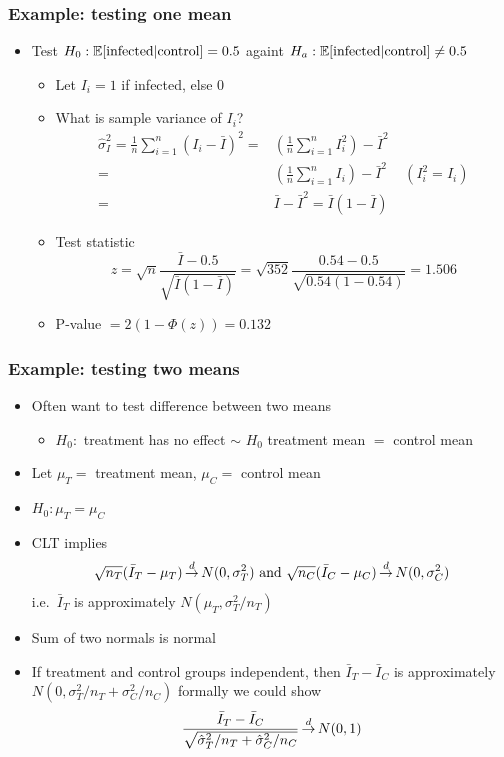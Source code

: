 \begin{frame}[shrink]
  \frametitle{Example: testing one mean}
  \begin{itemize}
  \item Test $H_0: \mathbb{E}[\text{infected}|\text{control}] = 0.5$ againt
    $H_a: \mathbb{E}[\text{infected}|\text{control}] \neq 0.5$
    \begin{itemize}
    \item Let $I_{i} = 1$ if infected, else $0$
    \item What is sample variance of $I_i$?
      \begin{align*}
        \hat{\sigma}_I^2 = \frac{1}{n} \sum_{i=1}^n (I_i - \bar{I})^2 = & \left(\frac{1}{n}
          \sum_{i=1}^n I_i^2\right) - \bar{I}^2 \\
        = &  \left(\frac{1}{n} \sum_{i=1}^n I_i \right) - \bar{I}^2
        \;\text{ }\; (I_i^2 = I_i) \\
        = & \bar{I} - \bar{I}^2 = \bar{I}(1-\bar{I})
      \end{align*}
    \item Test statistic
      \[ z = \sqrt{n} \frac{\bar{I} - 0.5}{\sqrt{\bar{I}(1-\bar{I})}} =
      \sqrt{352} \frac{0.54 - 0.5}{\sqrt{0.54(1-0.54)}} = 1.506 \]
    \item P-value $ = 2(1-\Phi(z)) = 0.132$
    \end{itemize}
  \end{itemize}
\end{frame}

\begin{frame}
  \frametitle{Example: testing two means}
  \begin{itemize}
  \item Often want to test difference between two means
    \begin{itemize}
    \item $H_0:$ treatment has no effect $\sim$ $H_0$ treatment mean $
      = $ control mean
    \end{itemize}
  \item Let $\mu_T = $ treatment mean, $\mu_C = $ control mean
  \item $H_0: \mu_T = \mu_C$
  \item CLT implies 
    \[ \sqrt{n_T} (\bar{I}_T - \mu_T) \indist N(0,
    \sigma_T^2) \text{ and } \sqrt{n_C} (\bar{I}_C - \mu_C) \indist N(0,
    \sigma_C^2) \]
    i.e.\ $\bar{I}_T $ is approximately $N(\mu_T, \sigma_T^2/n_T)$ 
  \item Sum of two normals is normal
  \item If treatment and control groups independent, then
    $\bar{I}_T - \bar{I}_C $ is approximately $N(0, \sigma_T^2/n_T +
    \sigma_C^2/n_C)$ formally we could show
    \begin{align*}
      \frac{\bar{I}_T - \bar{I}_C}{\sqrt{\hat{\sigma}_T^2/n_T  + \hat{\sigma}_C^2/n_C}} \indist N(0,1)
    \end{align*}
  \end{itemize}
\end{frame}

